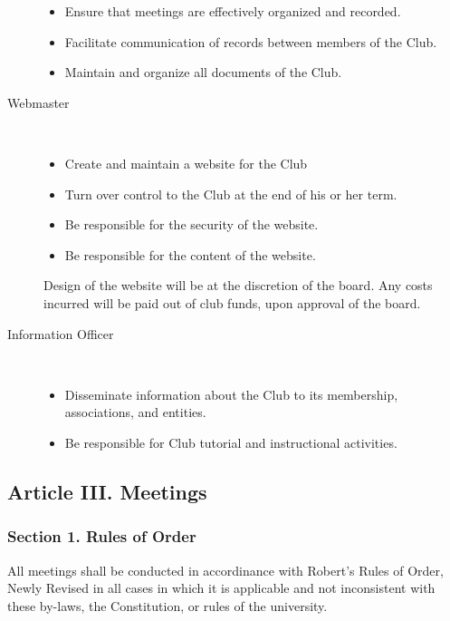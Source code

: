 \documentclass{article}
\begin{document}
\begin{description}
\begin{itemize}
            \item Ensure that meetings are effectively organized and recorded.
            \item Facilitate communication of records between members of the Club.
            \item Maintain and organize all documents of the Club.
          \end{itemize}
        \item[Webmaster] ~\\
          \vspace{-12pt}
          \begin{itemize}
            \item Create and maintain a website for the Club
            \item Turn over control to the Club at the end of his or her term.
            \item Be responsible for the security of the website.
            \item Be responsible for the content of the website.
          \end{itemize}

          Design of the website will be at the discretion of the board. Any costs incurred will be paid out of club funds, upon approval of the board.

        \item[Information Officer] ~\\
          \vspace{-12pt}
          \begin{itemize}
            \item Disseminate information about the Club to its membership, associations, and entities.
            \item Be responsible for Club tutorial and instructional activities.
          \end{itemize}
        \end{description}

  \subsection{Article III. Meetings}

    \subsubsection{Section 1. Rules of Order}
      All meetings shall be conducted in accordinance with Robert's Rules of Order, Newly Revised in all cases in which it is applicable and not inconsistent with these by-laws, the Constitution, or rules of the university.
\end{document}
